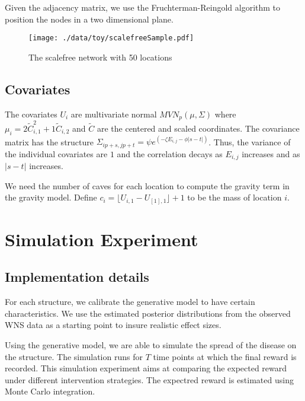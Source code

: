 \documentclass[11pt]{article}
\begin{document}
Given the adjacency matrix, we use the Fruchterman-Reingold algorithm
to position the nodes in a two dimensional plane.


\begin{figure}[htb]
\centering
\texttt{[image: ./data/toy/scalefreeSample.pdf]}
\caption{\label{fig:scalefree50}The scalefree network with 50 locations}
\end{figure}




\subsection{Covariates}
\label{sec-3-2}

The covariates $U_i$ are multivariate normal $MVN_p(\mu,\Sigma)$
where $\mu_i = 2\widetilde{C}_{i,1}^2 + 1\widetilde{C}_{i,2}$ and
$\widetilde{C}$ are the centered and scaled coordinates.  The
covariance matrix has the structure $\Sigma_{ip + s, jp + t} = \psi
   e^{(-\zeta E_{i,j} - \phi |s-t|)}$.  Thus, the variance of the
individual covariates are $1$ and the correlation decays as
$E_{i,j}$ increases and as $|s-t|$ increases.

We need the number of caves for each location to compute the
gravity term in the gravity model.  Define $c_i = \lfloor U_{i,1} -
   U_{[1],1} \rfloor + 1$ to be the mass of location $i$.


\section{Simulation Experiment}
\label{sec-4}

\subsection{Implementation details}
\label{sec-4-1}

For each structure, we calibrate the generative model to have
certain characteristics.  We use the estimated posterior
distributions from the observed WNS data as a starting point to
insure realistic effect sizes.

Using the generative model, we are able to simulate the spread of
the disease on the structure.  The simulation runs for $T$ time
points at which the final reward is recorded.  This simulation
experiment aims at comparing the expected reward under different
intervention strategies.  The expectred reward is estimated using
Monte Carlo integration.
\end{document}
